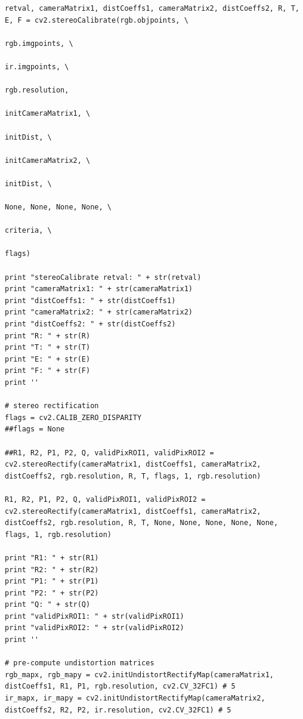 \begin{appendices}
\begin{lstlisting}
retval, cameraMatrix1, distCoeffs1, cameraMatrix2, distCoeffs2, R, T, E, F = cv2.stereoCalibrate(rgb.objpoints, \
                                                                                                 rgb.imgpoints, \
                                                                                                 ir.imgpoints, \
                                                                                                 rgb.resolution,
                                                                                                 initCameraMatrix1, \
                                                                                                 initDist, \
                                                                                                 initCameraMatrix2, \
                                                                                                 initDist, \
                                                                                                 None, None, None, None, \
                                                                                                 criteria, \
                                                                                                 flags)

print "stereoCalibrate retval: " + str(retval)
print "cameraMatrix1: " + str(cameraMatrix1)
print "distCoeffs1: " + str(distCoeffs1)
print "cameraMatrix2: " + str(cameraMatrix2)
print "distCoeffs2: " + str(distCoeffs2)
print "R: " + str(R)
print "T: " + str(T)
print "E: " + str(E)
print "F: " + str(F)
print ''

# stereo rectification
flags = cv2.CALIB_ZERO_DISPARITY
##flags = None

##R1, R2, P1, P2, Q, validPixROI1, validPixROI2 = cv2.stereoRectify(cameraMatrix1, distCoeffs1, cameraMatrix2, distCoeffs2, rgb.resolution, R, T, flags, 1, rgb.resolution)

R1, R2, P1, P2, Q, validPixROI1, validPixROI2 = cv2.stereoRectify(cameraMatrix1, distCoeffs1, cameraMatrix2, distCoeffs2, rgb.resolution, R, T, None, None, None, None, None, flags, 1, rgb.resolution)

print "R1: " + str(R1)
print "R2: " + str(R2)
print "P1: " + str(P1)
print "P2: " + str(P2)
print "Q: " + str(Q)
print "validPixROI1: " + str(validPixROI1)
print "validPixROI2: " + str(validPixROI2)
print ''

# pre-compute undistortion matrices
rgb_mapx, rgb_mapy = cv2.initUndistortRectifyMap(cameraMatrix1, distCoeffs1, R1, P1, rgb.resolution, cv2.CV_32FC1) # 5
ir_mapx, ir_mapy = cv2.initUndistortRectifyMap(cameraMatrix2, distCoeffs2, R2, P2, ir.resolution, cv2.CV_32FC1) # 5


\end{lstlisting}
\end{appendices}
